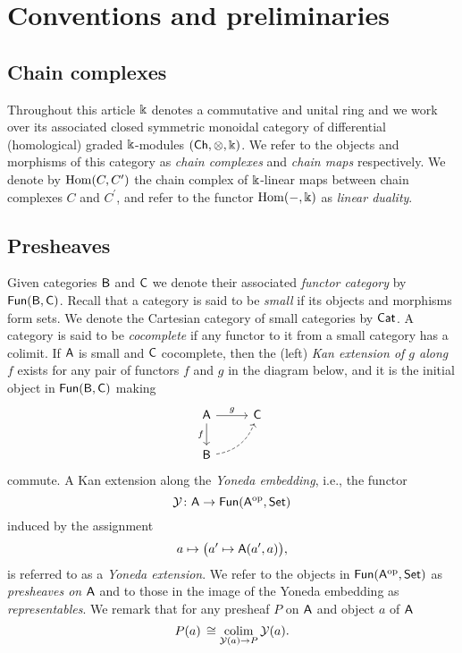 
\section{Conventions and preliminaries} \label{s:preliminaries}

\subsection{Chain complexes}

Throughout this article $\Bbbk$ denotes a commutative and unital ring and we work over its associated closed symmetric monoidal category of differential (homological) graded $\Bbbk$-modules $(\mathsf{Ch}, \otimes, \Bbbk)$.
We refer to the objects and morphisms of this category as \textit{chain complexes} and \textit{chain maps} respectively. We denote by $\mathrm{Hom}(C, C^\prime)$ the chain complex of $\Bbbk$-linear maps between chain complexes $C$ and $C^\prime$, and refer to the functor $\mathrm{Hom}(-, \Bbbk)$ as \textit{linear duality}.

\subsection{Presheaves}

Given categories $\mathsf{B}$ and $\mathsf{C}$ we denote their associated \textit{functor category} by $\mathsf{Fun}(\mathsf{B}, \mathsf{C})$.
Recall that a category is said to be \textit{small} if its objects and morphisms form sets.
We denote the Cartesian category of small categories by $\mathsf{Cat}$.
A category is said to be \textit{cocomplete} if any functor to it from a small category has a colimit.
If $\mathsf{A}$ is small and $\mathsf{C}$ cocomplete, then the (left) \textit{Kan extension of $g$ along $f$} exists for any pair of functors $f$ and $g$ in the diagram below, and it is the initial object in $\mathsf{Fun}(\mathsf{B}, \mathsf{C})$ making
\begin{equation*}
\begin{tikzcd}[column sep=normal, row sep=normal]
\sA \arrow[d, "f"'] \arrow[r, "g"] & \sC \\
\sB \arrow[dashed, ur, bend right] & \quad
\end{tikzcd}
\end{equation*}
commute.
A Kan extension along the \textit{Yoneda embedding}, i.e., the functor
\[
\operatorname{\mathcal{Y}} \colon \mathsf{A} \to \mathsf{Fun}(\mathsf{A}^{\mathrm{op}}, \mathsf{Set})
\]
induced by the assignment
\[
a \mapsto \big( a^\prime \mapsto \mathsf{A}(a^\prime, a) \big),
\]
is referred to as a \textit{Yoneda extension}.
We refer to the objects in $\mathsf{Fun}(\mathsf{A}^{\mathrm{op}}, \mathsf{Set})$ as \textit{presheaves on $\mathsf{A}$} and to those in the image of the Yoneda embedding as \textit{representables}.
We remark that for any presheaf $P$ on $\mathsf{A}$ and object $a$ of $\mathsf{A}$
\[
P(a) \, \cong \operatorname*{colim}_{\operatorname{\mathcal{Y}}(a) \to P} \operatorname{\mathcal{Y}}(a).
\]